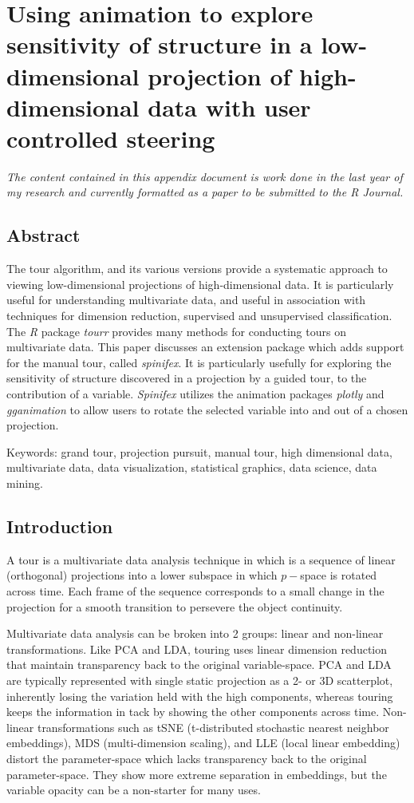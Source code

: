 \documentclass{monashthesis}
\begin{document}
\chapter{Using animation to explore sensitivity of structure in a
low-dimensional projection of high-dimensional data with user controlled
steering}\label{ch:spinifex_paper}

\emph{The content contained in this appendix document is work done in
the last year of my research and currently formatted as a paper to be
submitted to the R Journal.}

\section{Abstract}\label{abstract-1}

The tour algorithm, and its various versions provide a systematic
approach to viewing low-dimensional projections of high-dimensional
data. It is particularly useful for understanding multivariate data, and
useful in association with techniques for dimension reduction,
supervised and unsupervised classification. The \emph{R} package
\emph{tourr} provides many methods for conducting tours on multivariate
data. This paper discusses an extension package which adds support for
the manual tour, called \emph{spinifex}. It is particularly usefully for
exploring the sensitivity of structure discovered in a projection by a
guided tour, to the contribution of a variable. \emph{Spinifex} utilizes
the animation packages \emph{plotly} and \emph{gganimation} to allow
users to rotate the selected variable into and out of a chosen
projection.

Keywords: grand tour, projection pursuit, manual tour, high dimensional
data, multivariate data, data visualization, statistical graphics, data
science, data mining.

\section{Introduction}\label{introduction}

A tour is a multivariate data analysis technique in which is a sequence
of linear (orthogonal) projections into a lower subspace in which
\(p-\)space is rotated across time. Each frame of the sequence
corresponds to a small change in the projection for a smooth transition
to persevere the object continuity.

Multivariate data analysis can be broken into 2 groups: linear and
non-linear transformations. Like PCA and LDA, touring uses linear
dimension reduction that maintain transparency back to the original
variable-space. PCA and LDA are typically represented with single static
projection as a 2- or 3D scatterplot, inherently losing the variation
held with the high components, whereas touring keeps the information in
tack by showing the other components across time. Non-linear
transformations such as tSNE (t-distributed stochastic nearest neighbor
embeddings), MDS (multi-dimension scaling), and LLE (local linear
embedding) distort the parameter-space which lacks transparency back to
the original parameter-space. They show more extreme separation in
embeddings, but the variable opacity can be a non-starter for many uses.
\end{document}
